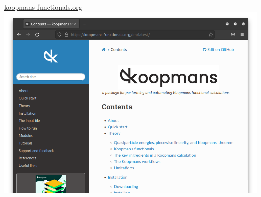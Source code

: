 \documentclass[xcolor=table,aspectratio=169]{beamer}
\numberwithin{equation}{section}
\begin{document}
\begin{frame}{}
\begin{columns}
      \begin{column}{0.4\textwidth}
         \centering
         \url{koopmans-functionals.org}
         \includegraphics[width=\columnwidth]{figures/website_cropped.png}
      \end{column}
   \end{columns}
\end{frame}
\end{document}
